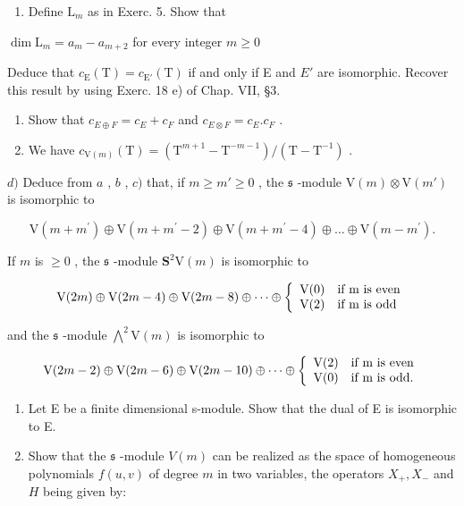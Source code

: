 \begin{enumerate}
\def\labelenumi{\alph{enumi})}
\tightlist
\item
  Define \(\mathrm{L}_m\) as in Exerc. 5. Show that
\end{enumerate}

\(\dim \mathrm{L}_m = a_m - a_{m + 2}\) for every integer \(m\geq 0\)

Deduce that \(c_{\mathrm{E}}(\mathrm{T}) = c_{\mathrm{E}'}(\mathrm{T})\) if and only if E and \(E'\) are isomorphic. Recover this result by using Exerc. 18 e) of Chap. VII, §3.

\begin{enumerate}
\def\labelenumi{\alph{enumi})}
\setcounter{enumi}{1}
\item
  Show that \(c_{E\oplus F} = c_{E} + c_{F}\) and \(c_{E\otimes F} = c_{E}.c_{F}\) .
\item
  We have \(c_{\mathrm{V}(m)}(\mathrm{T}) = (\mathrm{T}^{m + 1} - \mathrm{T}^{-m - 1}) / (\mathrm{T} - \mathrm{T}^{-1})\) .
\end{enumerate}

\(d)\) Deduce from \(a\) , \(b\) , \(c)\) that, if \(m \geq m' \geq 0\) , the \(\mathfrak{s}\) -module \(\mathrm{V}(m) \otimes \mathrm{V}(m')\) is isomorphic to

\[
\mathrm{V} (m + m ^ {\prime}) \oplus \mathrm{V} (m + m ^ {\prime} - 2) \oplus \mathrm{V} (m + m ^ {\prime} - 4) \oplus \dots \oplus \mathrm{V} (m - m ^ {\prime}).
\]

If \(m\) is \(\geq 0\) , the \(\mathfrak{s}\) -module \(\mathbf{S}^2\mathrm{V}(m)\) is isomorphic to

\[
\mathrm{V} (2 m) \oplus \mathrm{V} (2 m - 4) \oplus \mathrm{V} (2 m - 8) \oplus \dots \oplus \left\{ \begin{array}{l l} \mathrm{V} (0) & \text {if m is even} \\ \mathrm{V} (2) & \text {if m is odd} \end{array} \right.
\]

and the \(\mathfrak{s}\) -module \(\bigwedge^2\mathrm{V}(m)\) is isomorphic to

\[
\mathrm{V} (2 m - 2) \oplus \mathrm{V} (2 m - 6) \oplus \mathrm{V} (2 m - 10) \oplus \dots \oplus \left\{ \begin{array}{l l} \mathrm{V} (2) & \text {if m is even} \\ \mathrm{V} (0) & \text {if m is odd.} \end{array} \right.
\]

\begin{enumerate}
\def\labelenumi{\arabic{enumi})}
\setcounter{enumi}{6}
\item
  Let E be a finite dimensional s-module. Show that the dual of E is isomorphic to E.
\item
  Show that the \(\mathfrak{s}\) -module \(V(m)\) can be realized as the space of homogeneous polynomials \(f(u,v)\) of degree \(m\) in two variables, the operators \(X_{+}, X_{-}\) and \(H\) being given by:
\end{enumerate}

